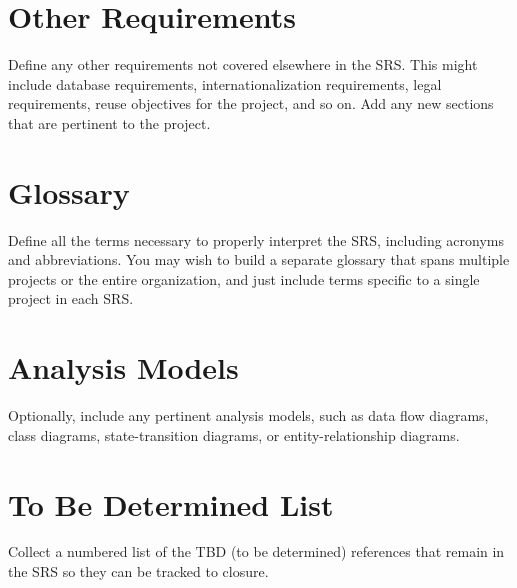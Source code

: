 \documentclass[a4paper,10pt]{article}
\begin{document}

\section{Other Requirements}
Define any other requirements not covered elsewhere in the SRS. This might include database requirements, internationalization requirements, legal requirements, reuse objectives for the project, and so on. Add any new sections that are pertinent to the project.

\begin{appendices}
\section{Glossary}
Define all the terms necessary to properly interpret the SRS, including acronyms and abbreviations. You may wish to build a separate glossary that spans multiple projects or the entire organization, and just include terms specific to a single project in each SRS.
\section{Analysis Models}
Optionally, include any pertinent analysis models, such as data flow diagrams, class diagrams, state-transition diagrams, or entity-relationship diagrams.
\section{To Be Determined List}
Collect a numbered list of the TBD (to be determined) references that remain in the SRS so they can be tracked to closure.
\end{appendices}


\end{document}
